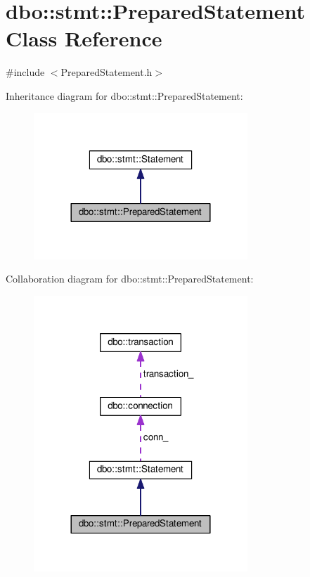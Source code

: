 \hypertarget{classdbo_1_1stmt_1_1_prepared_statement}{\section{dbo\+:\+:stmt\+:\+:Prepared\+Statement Class Reference}
\label{classdbo_1_1stmt_1_1_prepared_statement}
}


{\ttfamily \#include $<$Prepared\+Statement.\+h$>$}



Inheritance diagram for dbo\+:\+:stmt\+:\+:Prepared\+Statement\+:\nopagebreak
\begin{figure}[H]
\begin{center}
\leavevmode
\includegraphics[width=228pt]{classdbo_1_1stmt_1_1_prepared_statement__inherit__graph}
\end{center}
\end{figure}


Collaboration diagram for dbo\+:\+:stmt\+:\+:Prepared\+Statement\+:\nopagebreak
\begin{figure}[H]
\begin{center}
\leavevmode
\includegraphics[width=228pt]{classdbo_1_1stmt_1_1_prepared_statement__coll__graph}
\end{center}
\end{figure}
